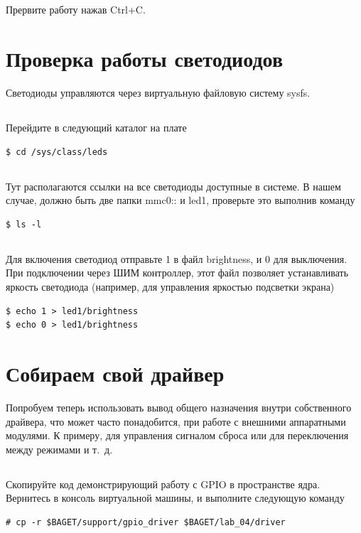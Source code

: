 \subsection{} Прервите работу нажав Ctrl+C.

\section{Проверка работы светодиодов}

Светодиоды управляются через виртуальную файловую систему sysfs. 

\subsection{} Перейдите в следующий каталог на плате
\begin{lstlisting}[style=bash]
$ cd /sys/class/leds
\end{lstlisting}

\subsection{} Тут располагаются ссылки на все светодиоды доступные в системе. В нашем случае, должно быть две папки mmc0:: и led1, проверьте это выполнив команду  
\begin{lstlisting}[style=bash]
$ ls -l
\end{lstlisting}

\subsection{} Для включения светодиод отправьте 1 в файл brightness, и 0 для выключения. При подключении через ШИМ контроллер, этот файл позволяет устанавливать яркость светодиода (например, для управления яркостью подсветки экрана)
\begin{lstlisting}[style=bash]
$ echo 1 > led1/brightness
$ echo 0 > led1/brightness
\end{lstlisting}

\section{Собираем свой драйвер}
Попробуем теперь использовать вывод общего назначения внутри собственного драйвера, что может часто понадобится, при работе с внешними аппаратными модулями. К примеру, для управления сигналом сброса или для переключения между режимами и т. д.

\subsection{} Скопируйте код демонстрирующий работу с GPIO в пространстве ядра. Вернитесь в консоль виртуальной машины, и выполните следующую команду
\begin{lstlisting}[style=bash]
# cp -r $BAGET/support/gpio_driver $BAGET/lab_04/driver
\end{lstlisting}

